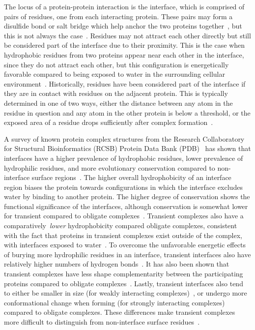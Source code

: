
The locus of a protein-protein interaction is the interface, which is comprised of pairs of residues, one from each interacting protein.
These pairs may form a disulfide bond or salt bridge which help anchor the two proteins together~\cite{yan2008}, but this is not always the case~\cite{ofran2003}.
Residues may not attract each other directly but still be considered part of the interface due to their proximity.
This is the case when hydrophobic residues from two proteins appear near each other in the interface, since they do not attract each other, but this configuration is energetically favorable compared to being exposed to water in the surrounding cellular environment~\cite{yan2008, ofran2003}.
Historically, residues have been considered part of the interface if they are in contact with residues on the adjacent protein. 
This is typically determined in one of two ways, either the distance between any atom in the residue in question and any atom in the other protein is below a threshold, or the exposed area of a residue drops sufficiently after complex formation~\cite{yan2008, jones1996, ofran2003, minhas2014}.

A survey of known protein complex structures from the Research Collaboratory for Structural Bioinformatics (RCSB) Protein Data Bank (PDB)~\cite{berman2000} has shown that interfaces have a higher prevalence of hydrophobic residues, lower prevalence of hydrophilic residues, and more evolutionary conservation compared to non-interface surface regions~\cite{yan2008}.
The higher overall hydrophobicity of an interface region biases the protein towards configurations in which the interface excludes water by binding to another protein.
The higher degree of conservation shows the functional significance of the interfaces, although conservation is somewhat lower for transient compared to obligate complexes~\cite{jones1996}.
Transient complexes also have a comparatively~\textit{lower} hydrophobicity compared obligate complexes, consistent with the fact that proteins in transient complexes exist outside of the complex, with interfaces exposed to water~\cite{jones1996}.
To overcome the unfavorable energetic effects of burying more hydrophilic residues in an interface, transient interfaces also have relatively higher numbers of hydrogen bonds~\cite{jones1996}.
It has also been shown that transient complexes have less shape complementarity between the participating proteins compared to obligate complexes~\cite{jones1996}.
Lastly, transient interfaces also tend to either be smaller in size (for weakly interacting complexes)~\cite{jones1996, perkins2010}, or undergo more conformational change when forming (for strongly interacting complexes)~\cite{perkins2010} compared to obligate complexes.
These differences make transient complexes more difficult to distinguish from non-interface surface residues~\cite{perkins2010}.

